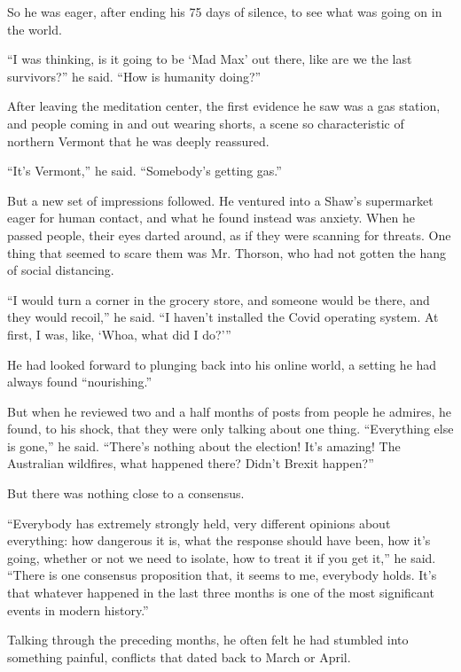 So he was eager, after ending his 75 days of silence, to see what was
going on in the world.

``I was thinking, is it going to be `Mad Max' out there, like are we the
last survivors?'' he said. ``How is humanity doing?''

After leaving the meditation center, the first evidence he saw was a gas
station, and people coming in and out wearing shorts, a scene so
characteristic of northern Vermont that he was deeply reassured.

``It's Vermont,'' he said. ``Somebody's getting gas.''

But a new set of impressions followed. He ventured into a Shaw's
supermarket eager for human contact, and what he found instead was
anxiety. When he passed people, their eyes darted around, as if they
were scanning for threats. One thing that seemed to scare them was Mr.
Thorson, who had not gotten the hang of social distancing.

``I would turn a corner in the grocery store, and someone would be
there, and they would recoil,'' he said. ``I haven't installed the Covid
operating system. At first, I was, like, `Whoa, what did I do?'''

He had looked forward to plunging back into his online world, a setting
he had always found ``nourishing.''

But when he reviewed two and a half months of posts from people he
admires, he found, to his shock, that they were only talking about one
thing. ``Everything else is gone,'' he said. ``There's nothing about the
election! It's amazing! The Australian wildfires, what happened there?
Didn't Brexit happen?''

But there was nothing close to a consensus.

``Everybody has extremely strongly held, very different opinions about
everything: how dangerous it is, what the response should have been, how
it's going, whether or not we need to isolate, how to treat it if you
get it,'' he said. ``There is one consensus proposition that, it seems
to me, everybody holds. It's that whatever happened in the last three
months is one of the most significant events in modern history.''

Talking through the preceding months, he often felt he had stumbled into
something painful, conflicts that dated back to March or April.

\href{https://www.nytimes.com/news-event/coronavirus?action=click\&pgtype=Article\&state=default\&region=MAIN_CONTENT_3\&context=storylines_faq}{}

